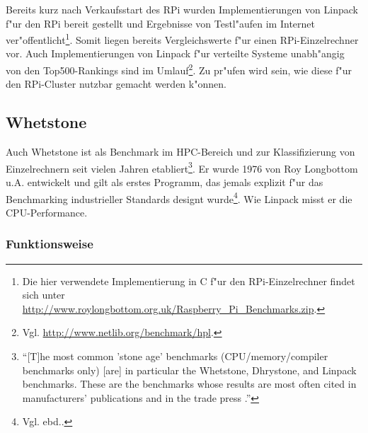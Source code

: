 Bereits kurz nach Verkaufsstart des RPi wurden Implementierungen von Linpack f"ur den RPi bereit gestellt und Ergebnisse von Testl"aufen im Internet ver"offentlicht\footnote{Die hier verwendete Implementierung in C f"ur den RPi-Einzelrechner findet sich unter \url{http://www.roylongbottom.org.uk/Raspberry_Pi_Benchmarks.zip}.}. Somit liegen bereits Vergleichswerte f"ur einen RPi-Einzelrechner vor. Auch Implementierungen von Linpack f"ur verteilte Systeme unabh"angig von den Top500-Rankings sind im Umlauf\footnote{Vgl. \url{http://www.netlib.org/benchmark/hpl}.}. Zu pr"ufen wird sein, wie diese f"ur den RPi-Cluster nutzbar gemacht werden k"onnen. 

\subsection{Whetstone}\label{Whetstone}

Auch Whetstone ist als Benchmark im HPC-Bereich und zur Klassifizierung von Einzelrechnern seit vielen Jahren etabliert\footnote{"`[T]he most common 'stone age' benchmarks (CPU/memory/compiler benchmarks only) [are] in particular the Whetstone, Dhrystone, and Linpack benchmarks. These are the benchmarks whose results are most often cited in manufacturers' publications and in the trade press \cite{wei90}."'}. Er wurde 1976 von Roy Longbottom u.A. entwickelt und gilt als erstes Programm, das jemals explizit f"ur das Benchmarking industrieller Standards designt wurde\footnote{Vgl. ebd..}. Wie Linpack misst er die CPU-Performance. 

\subsubsection{Funktionsweise}\label{Funktionsweise Whetstone}

